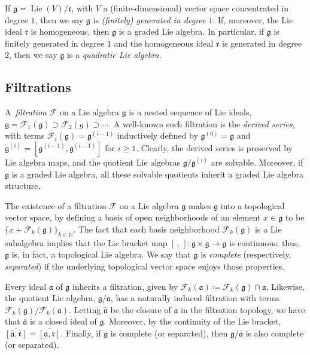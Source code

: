 \documentclass{article}
\numberwithin{equation}{section}
\theoremstyle{definition}
\newcommand{\N}{\mathbb{N}}
\newcommand{\F}{\mathcal{F}}
\newcommand{\fa}{\mathfrak{a}}
\newcommand{\g}{{\mathfrak{g}}}
\newcommand{\fr}{\mathfrak{r}}
\DeclareMathOperator{\Lie}{Lie}
\begin{document}
If $\g=\Lie(V)/\fr$, with $V$ a (finite-dimensional) vector space 
concentrated in degree $1$,  
then we say $\g$ is {\em (finitely) generated in degree $1$}.  
If, moreover, the Lie ideal $\mathfrak{r}$ is homogeneous, 
then $\g$ is a graded Lie algebra.  In particular, if $\g$ is 
finitely generated in degree $1$ and the homogeneous ideal 
$\mathfrak{r}$ is generated in degree $2$, then we say 
 $\g$ is a \textit{quadratic Lie algebra}. 

\subsection{Filtrations}
\label{subsec:series}
A\, {\em filtration}\/ $\F$ on a Lie algebra $\g$ is a nested 
sequence of Lie ideals, $\g=\F_1(\g)\supset \F_2(g)\supset \cdots$.  
A well-known such filtration is the {\em derived series}, with terms 
$\F_i(\g)=\g^{(i-1)}$ inductively defined by $\g^{(0)}=\g$ and 
$\g^{(i)}=[\g^{(i-1)}, \g^{(i-1)}]$ for $i\ge 1$. Clearly, 
the derived series is preserved by Lie algebra maps, and 
the quotient Lie algebras $\g/\g^{(i)}$ are solvable. Moreover, 
if $\g$ is a graded Lie algebra, all these solvable quotients 
inherit a graded Lie algebra structure. 

The existence of a filtration $\F$ on a Lie algebra $\g$  
makes $\g$ into a topological vector space, by defining 
a basis of open neighborhoods of an element $x\in\g$ 
to be $\{x+\F_k (\g)\}_{k\in \N}$. The fact that each basis 
neighborhood $\F_k(\g)$ is a Lie subalgebra implies that the Lie 
bracket map $[\,,\,]\colon \g \times \g \to \g$ is continuous; thus, 
$\g$ is, in fact, a topological Lie algebra. 
We say that $\g$ is {\em complete}\/ (respectively, {\em separated}) 
if the underlying topological vector space enjoys those properties. 

Every ideal $\mathfrak{a}$ of $\g$ inherits a filtration,  
given by $\F_k (\mathfrak{a})\coloneqq \F_k (\g)\cap \mathfrak{a}$.  
Likewise, the quotient Lie algebra, $\g/\mathfrak{a}$, has a naturally induced 
filtration with terms $\F_k (\g)/\F_k (\mathfrak{a})$. 
Letting $\overline{\mathfrak{a}}$ be the closure of $\mathfrak{a}$ 
in the filtration topology, we have that $\overline{\mathfrak{a}}$ is a closed ideal 
of $\g$. Moreover, by the continuity of the Lie bracket, 
$\overline{[\bar{\fa},\bar{\fr}]}=\overline{[\fa,\fr]}$. 
Finally, if $\g$ is complete (or separated), then $\g/\overline{\mathfrak{a}}$ 
is also complete (or separated). 
\end{document}
